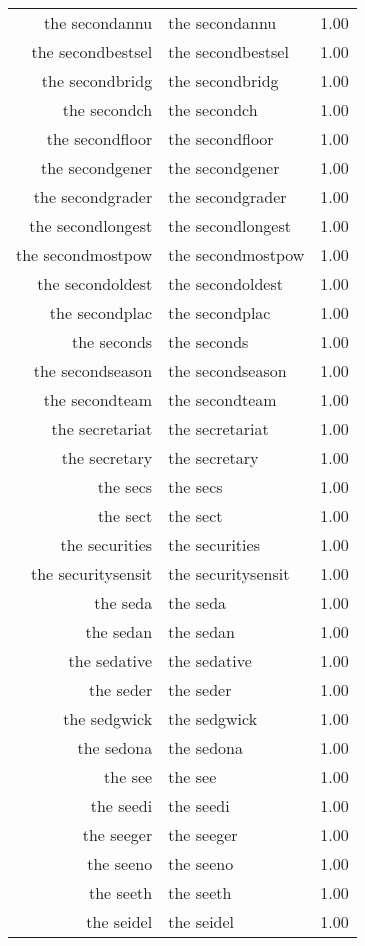 \begin{table}[ht]
\begin{tabular}{rlr}
  the secondannu & the secondannu & 1.00 \\ 
  the secondbestsel & the secondbestsel & 1.00 \\ 
  the secondbridg & the secondbridg & 1.00 \\ 
  the secondch & the secondch & 1.00 \\ 
  the secondfloor & the secondfloor & 1.00 \\ 
  the secondgener & the secondgener & 1.00 \\ 
  the secondgrader & the secondgrader & 1.00 \\ 
  the secondlongest & the secondlongest & 1.00 \\ 
  the secondmostpow & the secondmostpow & 1.00 \\ 
  the secondoldest & the secondoldest & 1.00 \\ 
  the secondplac & the secondplac & 1.00 \\ 
  the seconds & the seconds & 1.00 \\ 
  the secondseason & the secondseason & 1.00 \\ 
  the secondteam & the secondteam & 1.00 \\ 
  the secretariat & the secretariat & 1.00 \\ 
  the secretary & the secretary & 1.00 \\ 
  the secs & the secs & 1.00 \\ 
  the sect & the sect & 1.00 \\ 
  the securities & the securities & 1.00 \\ 
  the securitysensit & the securitysensit & 1.00 \\ 
  the seda & the seda & 1.00 \\ 
  the sedan & the sedan & 1.00 \\ 
  the sedative & the sedative & 1.00 \\ 
  the seder & the seder & 1.00 \\ 
  the sedgwick & the sedgwick & 1.00 \\ 
  the sedona & the sedona & 1.00 \\ 
  the see & the see & 1.00 \\ 
  the seedi & the seedi & 1.00 \\ 
  the seeger & the seeger & 1.00 \\ 
  the seeno & the seeno & 1.00 \\ 
  the seeth & the seeth & 1.00 \\ 
  the seidel & the seidel & 1.00 \\ 

\end{tabular}
\end{table}
